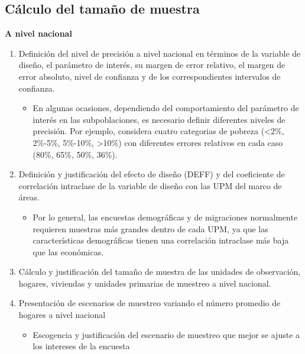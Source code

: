 \documentclass[
  10pt,
  spanish,
]{book}
\providecommand{\tightlist}{%
  \setlength{\itemsep}{0pt}\setlength{\parskip}{0pt}}
\begin{document}
\hypertarget{cuxe1lculo-del-tamauxf1o-de-muestra-1}{%
\subsection*{Cálculo del tamaño de muestra}\label{cuxe1lculo-del-tamauxf1o-de-muestra-1}}

\textbf{A nivel nacional}

\begin{enumerate}
\def\labelenumi{\arabic{enumi}.}
\tightlist
\item
  Definición del nivel de precisión a nivel nacional en términos de la variable de diseño, el parámetro de interés, su margen de error relativo, el margen de error absoluto, nivel de confianza y de los correspondientes intervalos de confianza.

  \begin{itemize}
  \tightlist
  \item
    En algunas ocasiones, dependiendo del comportamiento del parámetro de interés en las subpoblaciones, es necesario definir diferentes niveles de precisión. Por ejemplo, \citet{Caceres_2015} considera cuatro categorias de pobreza (\textless2\%, 2\%-5\%, 5\%-10\%, \textgreater10\%) con diferentes errores relativos en cada caso (80\%, 65\%, 50\%, 36\%).
  \end{itemize}
\item
  Definición y justificación del efecto de diseño (DEFF) y del coeficiente de correlación intraclase de la variable de diseño con las UPM del marco de áreas.

  \begin{itemize}
  \tightlist
  \item
    Por lo general, las encuestas demográficas y de migraciones normalmente
    requieren muestras más grandes dentro de cada UPM, ya que las características demográficas tienen una correlación intraclase más baja que las económicas.
  \end{itemize}
\item
  Cálculo y justificación del tamaño de muestra de las unidades de observación, hogares, viviendas y unidades primarias de muestreo a nivel nacional.
\item
  Presentación de escenarios de muestreo variando el número promedio de hogares a nivel nacional

  \begin{itemize}
  \tightlist
  \item
    Escogencia y justificación del escenario de muestreo que mejor se ajuste a los intereses de la encuesta
  \end{itemize}
\end{enumerate}
\end{document}
